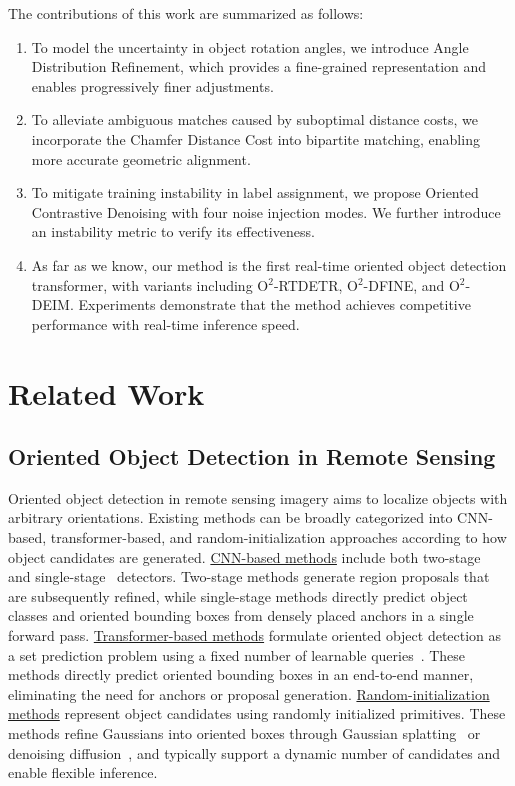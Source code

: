 \documentclass[lettersize,journal]{IEEEtran}
\begin{document}
The contributions of this work are summarized as follows:
\begin{enumerate}
\renewcommand{\labelenumi}{\arabic{enumi})}
\item To model the uncertainty in object rotation angles, we introduce Angle Distribution Refinement, which provides a fine-grained representation and enables progressively finer adjustments.
\item To alleviate ambiguous matches caused by suboptimal distance costs, we incorporate the Chamfer Distance Cost into bipartite matching, enabling more accurate geometric alignment.
\item To mitigate training instability in label assignment, we propose Oriented Contrastive Denoising with four noise injection modes. We further introduce an instability metric to verify its effectiveness.
\item As far as we know, our method is the first real-time oriented object detection transformer, with variants including O$^2$-RTDETR, O$^2$-DFINE, and O$^2$-DEIM. Experiments demonstrate that the method achieves competitive performance with real-time inference speed.
\end{enumerate}


\section{Related Work}


\subsection{Oriented Object Detection in Remote Sensing}
Oriented object detection in remote sensing imagery aims to localize objects with arbitrary orientations. Existing methods can be broadly categorized into CNN-based, transformer-based, and random-initialization approaches according to how object candidates are generated. 
\underline{CNN-based methods} include both two-stage~\cite{orientedrcnn,redet} and single-stage~\cite{messdet,dcfl} detectors. Two-stage methods generate region proposals that are subsequently refined, while single-stage methods directly predict object classes and oriented bounding boxes from densely placed anchors in a single forward pass. 
\underline{Transformer-based methods} formulate oriented object detection as a set prediction problem using a fixed number of learnable queries~\cite{orienteddetr,arsdetr}. These methods directly predict oriented bounding boxes in an end-to-end manner, eliminating the need for anchors or proposal generation.
\underline{Random-initialization methods} represent object candidates using randomly initialized primitives. These methods refine Gaussians into oriented boxes through Gaussian splatting~\cite{gsdet} or denoising diffusion~\cite{rediffdet}, and typically support a dynamic number of candidates and enable flexible inference.
\end{document}
